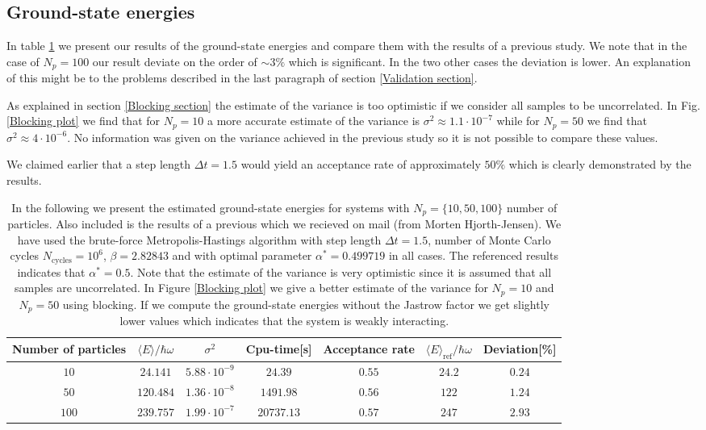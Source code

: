 \documentclass[a4paper,10pt]{article}
\begin{document}
\subsection{Ground-state energies}
In table \ref{Result table full system} we present our results of the ground-state energies and compare them with the results of a previous study.
We note that in the case of $N_p = 100$ our result deviate on the order of $\sim3\%$ which is significant. In the two other cases the deviation is lower.
An explanation of this might be to the problems described in the last paragraph of section \ref{Validation section}. 

As explained in section \ref{Blocking section} the estimate of the variance is too optimistic if we consider all samples to be uncorrelated. In Fig. \ref{Blocking plot}
we find that for $N_p=10$ a more accurate estimate of the variance is $\sigma^2 \approx 1.1 \cdot 10^{-7} $ while for $N_p = 50$ 
we find that $\sigma^2 \approx 4 \cdot 10^{-6}$. No information was given on the 
variance achieved in the previous study so it is not possible to compare these values.

We claimed earlier that a step length $\Delta t = 1.5$ would yield an acceptance rate of approximately $50\%$ which is clearly demonstrated by the results. 

\begin{table}[h!]
    \centering
    \caption{In the following we present the estimated ground-state energies for systems with $N_p = \{10,50,100\}$ number of particles. Also included
    is the results of a previous which we recieved on mail (from Morten Hjorth-Jensen). We have used
    the brute-force Metropolis-Hastings algorithm with step length $\Delta t = 1.5$, number of Monte Carlo cycles $N_{\text{cycles}} = 10^6$, $\beta = 2.82843$ and 
    with optimal parameter $\alpha^* = 0.499719$ in all cases. The referenced results indicates that $\alpha^* = 0.5$. Note that the estimate of the variance is 
    very optimistic since it is assumed that all samples are uncorrelated. In Figure \ref{Blocking plot} we give a better estimate of the variance for $N_p = 10$ and $N_p = 50$ using blocking. 
    If we compute the ground-state energies without the Jastrow factor we get slightly lower values which indicates that the system is weakly
    interacting.}
    \begin{tabular}{  c  c  c  c  c c c}
	\hline
	\hline
	Number of particles & $\langle E \rangle / \hbar \omega$ & $\sigma ^2$ & Cpu-time[s] & Acceptance rate & $\langle E \rangle_{\text{ref}}/\hbar \omega$ & Deviation[\%] \\
	\hline
	$10$ & $24.141$ & $5.88\cdot 10^{-9}$  & $24.39$ & $0.55$      & $24.2$ &  $0.24$  \\
	$50$ & $120.484$ & $1.36\cdot 10^{-8}$  & $1491.98$ & $0.56$   & $122$  &  $1.24$        \\
	$100$ & $239.757$ & $1.99\cdot 10^{-7}$  & $20737.13$ & $0.57$ & $247$  &  $2.93$        \\
	\hline
	\hline
    \end{tabular}
    \label{Result table full system}
\end{table}
\end{document}
